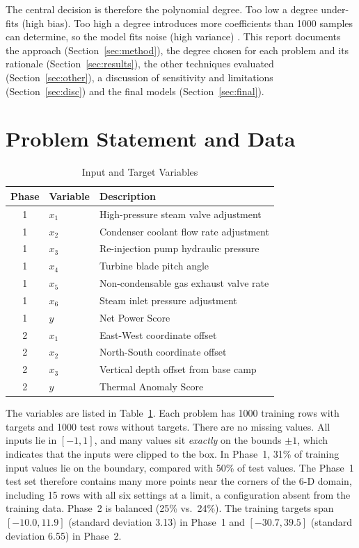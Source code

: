 \documentclass[conference]{IEEEtran}
\begin{document}
The central decision is therefore the polynomial degree. Too low a degree under-fits (high bias). Too high a degree introduces more coefficients than 1000 samples can determine, so the model fits noise (high variance) \cite{hastie2009}. This report documents the approach (Section~\ref{sec:method}), the degree chosen for each problem and its rationale (Section~\ref{sec:results}), the other techniques evaluated (Section~\ref{sec:other}), a discussion of sensitivity and limitations (Section~\ref{sec:disc}) and the final models (Section~\ref{sec:final}).

\section{Problem Statement and Data}\label{sec:data}
\begin{table}[!t]
\renewcommand{\arraystretch}{1.12}
\caption{Input and Target Variables}
\label{tab:vars}
\centering\footnotesize
\begin{tabular}{@{}cll@{}}
\toprule
Phase & Variable & Description \\
\midrule
1 & $x_1$ & High-pressure steam valve adjustment \\
1 & $x_2$ & Condenser coolant flow rate adjustment \\
1 & $x_3$ & Re-injection pump hydraulic pressure \\
1 & $x_4$ & Turbine blade pitch angle \\
1 & $x_5$ & Non-condensable gas exhaust valve rate \\
1 & $x_6$ & Steam inlet pressure adjustment \\
1 & $y$ & Net Power Score \\
\midrule
2 & $x_1$ & East-West coordinate offset \\
2 & $x_2$ & North-South coordinate offset \\
2 & $x_3$ & Vertical depth offset from base camp \\
2 & $y$ & Thermal Anomaly Score \\
\bottomrule
\end{tabular}
\end{table}

The variables are listed in Table~\ref{tab:vars}. Each problem has 1000 training rows with targets and 1000 test rows without targets. There are no missing values. All inputs lie in $[-1,1]$, and many values sit \emph{exactly} on the bounds $\pm1$, which indicates that the inputs were clipped to the box. In Phase~1, 31\% of training input values lie on the boundary, compared with 50\% of test values. The Phase~1 test set therefore contains many more points near the corners of the 6-D domain, including 15 rows with all six settings at a limit, a configuration absent from the training data. Phase~2 is balanced (25\% vs.\ 24\%). The training targets span $[-10.0, 11.9]$ (standard deviation 3.13) in Phase~1 and $[-30.7, 39.5]$ (standard deviation 6.55) in Phase~2.
\end{document}
